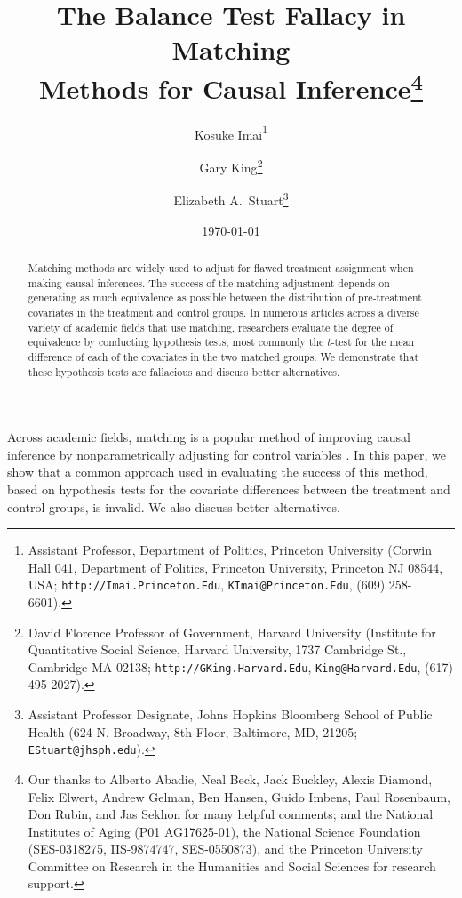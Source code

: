 \documentclass[11pt,titlepage]{article}
\title{The Balance Test Fallacy in Matching\\ Methods for Causal
  Inference\thanks{Our thanks to Alberto Abadie, Neal Beck, Jack
    Buckley, Alexis Diamond, Felix Elwert, Andrew Gelman, Ben Hansen,
    Guido Imbens, Paul Rosenbaum, Don Rubin, and Jas Sekhon for many
    helpful comments; and the National Institutes of Aging (P01
    AG17625-01), the National Science Foundation (SES-0318275,
    IIS-9874747, SES-0550873), and the Princeton University Committee
    on Research in the Humanities and Social Sciences for research
    support.}}
\author{Kosuke Imai\thanks{Assistant Professor, Department of
    Politics, Princeton University (Corwin Hall 041, Department of
    Politics, Princeton University, Princeton NJ 08544, USA;
    \texttt{http://Imai.Princeton.Edu}, \texttt{KImai@Princeton.Edu},
    (609) 258-6601).}  \and Gary King\thanks{David Florence Professor
    of Government, Harvard University (Institute for Quantitative
    Social Science, Harvard University, 1737 Cambridge St., Cambridge
    MA 02138; \texttt{http://GKing.Harvard.Edu},
    \texttt{King@Harvard.Edu}, (617) 495-2027).}  \and Elizabeth A.\ 
  Stuart\thanks{Assistant Professor Designate, Johns Hopkins Bloomberg
    School of Public Health (624 N. Broadway, 8th Floor, Baltimore,
    MD, 21205; \texttt{EStuart@jhsph.edu}).}}
\date{\today}
\begin{document}
\maketitle

\begin{abstract}
  Matching methods are widely used to adjust for flawed treatment
  assignment when making causal inferences.  The success of the
  matching adjustment depends on generating as much equivalence as
  possible between the distribution of pre-treatment covariates in the
  treatment and control groups.  In numerous articles across a diverse
  variety of academic fields that use matching, researchers evaluate
  the degree of equivalence by conducting hypothesis tests, most
  commonly the $t$-test for the mean difference of each of the
  covariates in the two matched groups.  We demonstrate that these
  hypothesis tests are fallacious and discuss better alternatives.
\end{abstract}

Across academic fields, matching is a popular method of improving
causal inference by nonparametrically adjusting for control variables
\citep{Imbens04,Rosenbaum02,Rubin06}.  In this paper, we show that a
common approach used in evaluating the success of this method, based
on hypothesis tests for the covariate differences between the treatment
and control groups, is invalid.  We also discuss better alternatives.
\end{document}
